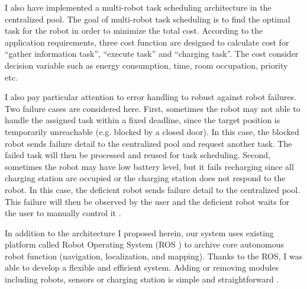 I also have implemented a multi-robot task scheduling architecture in the centralized pool. The goal of multi-robot task scheduling is to find the optimal task for the robot in order to minimize the total cost. According to the application requirements, three cost function are designed to calculate cost for ``gather information task'', ``execute task'' and ``charging task''. The cost consider decision variable such as energy consumption, time, room occupation, priority etc. 


I also pay particular attention to error handling to robust against robot failures. 
Two failure cases are considered here. First, sometimes the robot may not able to handle the assigned task within a fixed deadline, since the target position is temporarily unreachable (e.g. blocked by a closed door). In this case, the blocked robot sends failure detail to the centralized pool and request another task. The failed task will then be processed and reused for task scheduling. Second, sometimes the robot may have low battery level, but it fails recharging since all charging station are occupied or the charging station does not respond to the robot. In this case, the deficient robot sends failure detail to the centralized pool. This failure will then be observed by the user and the deficient robot waits for the user to manually control it \cite{Shah7}.

In addition to the architecture I proposed herein, our system uses existing platform called Robot Operating System (ROS \cite{ROSWEB}) to archive core autonomous robot function (navigation, localization, and mapping). Thanks to the ROS, I was able to develop a flexible and efficient system. Adding or removing modules including robots, sensors or charging station is simple and straightforward \cite{Shah7}.




